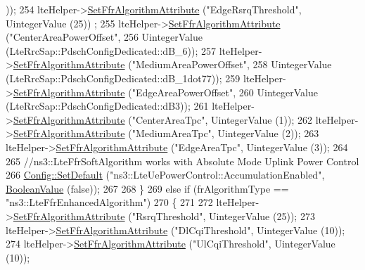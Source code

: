 \begin{DoxyCode}
      ));
254       lteHelper->\hyperlink{classns3_1_1LteHelper_a793d56e843a844428851e90752c5f130}{SetFfrAlgorithmAttribute} (\textcolor{stringliteral}{"EdgeRsrqThreshold"}, UintegerValue (25))
      ;
255       lteHelper->\hyperlink{classns3_1_1LteHelper_a793d56e843a844428851e90752c5f130}{SetFfrAlgorithmAttribute} (\textcolor{stringliteral}{"CenterAreaPowerOffset"},
256                                            UintegerValue (LteRrcSap::PdschConfigDedicated::dB\_6));
257       lteHelper->\hyperlink{classns3_1_1LteHelper_a793d56e843a844428851e90752c5f130}{SetFfrAlgorithmAttribute} (\textcolor{stringliteral}{"MediumAreaPowerOffset"},
258                                            UintegerValue (LteRrcSap::PdschConfigDedicated::dB\_1dot77));
259       lteHelper->\hyperlink{classns3_1_1LteHelper_a793d56e843a844428851e90752c5f130}{SetFfrAlgorithmAttribute} (\textcolor{stringliteral}{"EdgeAreaPowerOffset"},
260                                            UintegerValue (LteRrcSap::PdschConfigDedicated::dB3));
261       lteHelper->\hyperlink{classns3_1_1LteHelper_a793d56e843a844428851e90752c5f130}{SetFfrAlgorithmAttribute} (\textcolor{stringliteral}{"CenterAreaTpc"}, UintegerValue (1));
262       lteHelper->\hyperlink{classns3_1_1LteHelper_a793d56e843a844428851e90752c5f130}{SetFfrAlgorithmAttribute} (\textcolor{stringliteral}{"MediumAreaTpc"}, UintegerValue (2));
263       lteHelper->\hyperlink{classns3_1_1LteHelper_a793d56e843a844428851e90752c5f130}{SetFfrAlgorithmAttribute} (\textcolor{stringliteral}{"EdgeAreaTpc"}, UintegerValue (3));
264 
265       \textcolor{comment}{//ns3::LteFfrSoftAlgorithm works with Absolute Mode Uplink Power Control}
266       \hyperlink{group__config_ga2e7882df849d8ba4aaad31c934c40c06}{Config::SetDefault} (\textcolor{stringliteral}{"ns3::LteUePowerControl::AccumulationEnabled"}, 
      \hyperlink{classns3_1_1BooleanValue}{BooleanValue} (\textcolor{keyword}{false}));
267 
268     \}
269   \textcolor{keywordflow}{else} \textcolor{keywordflow}{if} (frAlgorithmType == \textcolor{stringliteral}{"ns3::LteFfrEnhancedAlgorithm"})
270     \{
271 
272       lteHelper->\hyperlink{classns3_1_1LteHelper_a793d56e843a844428851e90752c5f130}{SetFfrAlgorithmAttribute} (\textcolor{stringliteral}{"RsrqThreshold"}, UintegerValue (25));
273       lteHelper->\hyperlink{classns3_1_1LteHelper_a793d56e843a844428851e90752c5f130}{SetFfrAlgorithmAttribute} (\textcolor{stringliteral}{"DlCqiThreshold"}, UintegerValue (10));
274       lteHelper->\hyperlink{classns3_1_1LteHelper_a793d56e843a844428851e90752c5f130}{SetFfrAlgorithmAttribute} (\textcolor{stringliteral}{"UlCqiThreshold"}, UintegerValue (10));

\end{DoxyCode}
